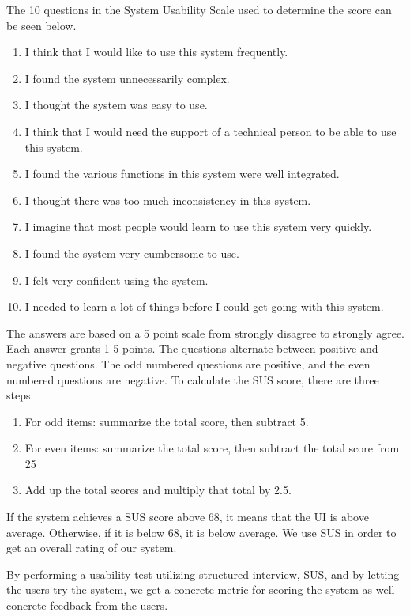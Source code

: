 The 10 questions in the System Usability Scale used to determine the score can be seen below.
\begin{enumerate}
	\item I think that I would like to use this system frequently.
	\item I found the system unnecessarily complex.
	\item I thought the system was easy to use.
	\item I think that I would need the support of a technical person to be able to use this system.
	\item I found the various functions in this system were well integrated.
	\item I thought there was too much inconsistency in this system.
	\item I imagine that most people would learn to use this system very quickly.
	\item I found the system very cumbersome to use.
	\item I felt very confident using the system.
	\item I needed to learn a lot of things before I could get going with this system.
\end{enumerate}
The answers are based on a 5 point scale from strongly disagree to strongly agree.
Each answer grants 1-5 points.
The questions alternate between positive and negative questions. The odd numbered questions are positive, and the even numbered questions are negative.\cite{adobeSUS}
To calculate the SUS score, there are three steps:
\begin{enumerate}
	\item For odd items: summarize the total score, then subtract 5.
	\item For even items: summarize the total score, then subtract the total score from 25
	\item Add up the total scores and multiply that total by 2.5.
\end{enumerate}
If the system achieves a SUS score above 68, it means that the UI is above average. Otherwise, if it is below 68, it is below average\cite{adobeSUS}.
We use SUS in order to get an overall rating of our system.

By performing a usability test utilizing structured interview, SUS, and by letting the users try the system, we get a concrete metric for scoring the system as well concrete feedback from the users.

